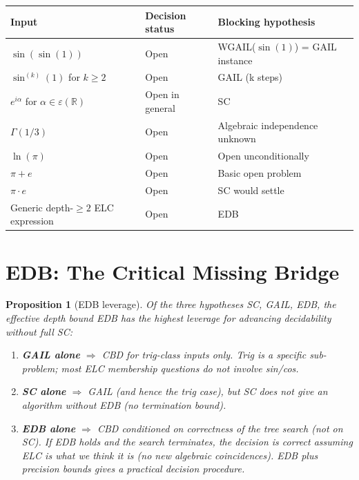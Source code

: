 \documentclass[11pt]{article}
\newtheorem{proposition}[theorem]{Proposition}
\begin{document}
\begin{center}
\renewcommand{\arraystretch}{1.2}
\begin{tabular}{lll}
\toprule
Input & Decision status & Blocking hypothesis \\
\midrule
$\sin(\sin(1))$ & Open & WGAIL($\sin(1)$) = GAIL instance \\
$\sin^{(k)}(1)$ for $k \geq 2$ & Open & GAIL (k steps) \\
$e^{i\alpha}$ for $\alpha \in \varepsilon(\mathbb{R})$ & Open in general & SC \\
$\Gamma(1/3)$ & Open & Algebraic independence unknown \\
$\ln(\pi)$ & Open & Open unconditionally \\
$\pi + e$ & Open & Basic open problem \\
$\pi \cdot e$ & Open & SC would settle \\
Generic depth-$\geq 2$ ELC expression & Open & EDB \\
\bottomrule
\end{tabular}
\end{center}

\section{EDB: The Critical Missing Bridge}

\begin{proposition}[EDB leverage]
\label{prop:edb_leverage}
Of the three hypotheses SC, GAIL, EDB, the effective depth bound EDB has the
highest leverage for advancing decidability without full SC:
\begin{enumerate}
  \item \textbf{GAIL alone} $\Rightarrow$ CBD for trig-class inputs only.
    Trig is a specific sub-problem; most ELC membership questions do not involve sin/cos.
  \item \textbf{SC alone} $\Rightarrow$ GAIL (and hence the trig case),
    but SC does not give an algorithm without EDB (no termination bound).
  \item \textbf{EDB alone} $\Rightarrow$ CBD conditioned on correctness of the
    tree search (not on SC). If EDB holds and the search terminates,
    the decision is correct assuming ELC is what we think it is
    (no new algebraic coincidences). EDB plus precision bounds gives a
    practical decision procedure.
\end{enumerate}
\end{proposition}
\end{document}
